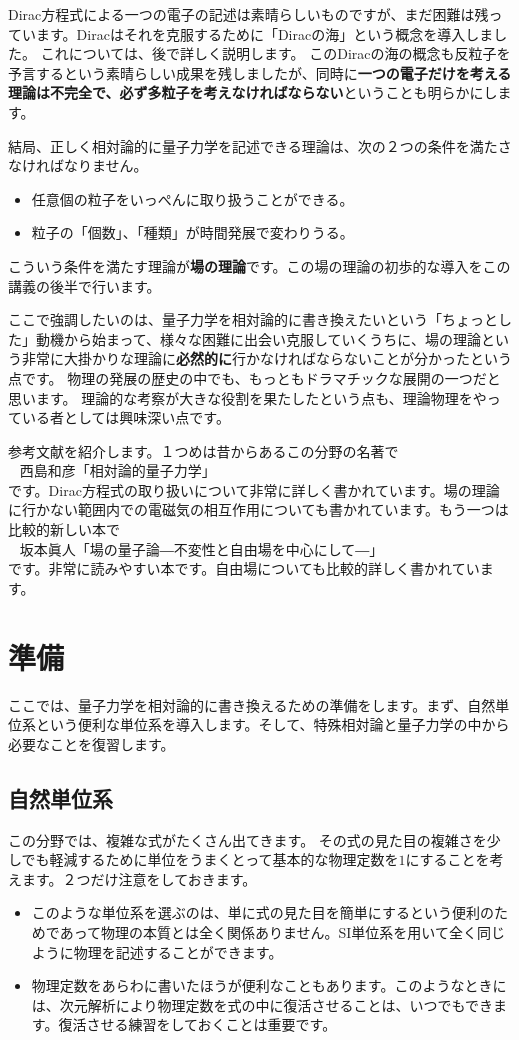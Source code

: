 \documentclass[report,paper=a4, fontsize=12pt, line_length=16cm, number_of_lines=33,dvipdfmx]{jlreq}
\newenvironment{mycite}{\\ \qquad \textbullet\ }{\\}
\numberwithin{equation}{chapter}
\newcommand{\strong}[1]{{\sffamily \bfseries #1}}
\begin{document}
Dirac方程式による一つの電子の記述は素晴らしいものですが、まだ困難は残っています。Diracはそれを克服するために「Diracの海」という概念を導入しました。
これについては、後で詳しく説明します。
このDiracの海の概念も反粒子を予言するという素晴らしい成果を残しましたが、同時に\strong{一つの電子だけを考える理論は不完全で、必ず多粒子を考えなければならない}ということも明らかにします。

結局、正しく相対論的に量子力学を記述できる理論は、次の２つの条件を満たさなければなりません。
\begin{itemize}
  \item 任意個の粒子をいっぺんに取り扱うことができる。
  \item 粒子の「個数」、「種類」が時間発展で変わりうる。
\end{itemize}
こういう条件を満たす理論が\strong{場の理論}です。この場の理論の初歩的な導入をこの講義の後半で行います。

ここで強調したいのは、量子力学を相対論的に書き換えたいという「ちょっとした」動機から始まって、様々な困難に出会い克服していくうちに、場の理論という非常に大掛かりな理論に\strong{必然的に}行かなければならないことが分かったという点です。
物理の発展の歴史の中でも、もっともドラマチックな展開の一つだと思います。
理論的な考察が大きな役割を果たしたという点も、理論物理をやっている者としては興味深い点です。

参考文献を紹介します。１つめは昔からあるこの分野の名著で
\begin{mycite}
  西島和彦「相対論的量子力学」
\end{mycite}
です。Dirac方程式の取り扱いについて非常に詳しく書かれています。場の理論に行かない範囲内での電磁気の相互作用についても書かれています。もう一つは比較的新しい本で
\begin{mycite}
  坂本眞人「場の量子論―不変性と自由場を中心にして―」
\end{mycite}
です。非常に読みやすい本です。自由場についても比較的詳しく書かれています。

\chapter{準備}
ここでは、量子力学を相対論的に書き換えるための準備をします。まず、自然単位系という便利な単位系を導入します。そして、特殊相対論と量子力学の中から必要なことを復習します。

\section{自然単位系}
この分野では、複雑な式がたくさん出てきます。
その式の見た目の複雑さを少しでも軽減するために単位をうまくとって基本的な物理定数を$1$にすることを考えます。２つだけ注意をしておきます。
\begin{itemize}
  \item このような単位系を選ぶのは、単に式の見た目を簡単にするという便利のためであって物理の本質とは全く関係ありません。SI単位系を用いて全く同じように物理を記述することができます。
  \item 物理定数をあらわに書いたほうが便利なこともあります。このようなときには、次元解析により物理定数を式の中に復活させることは、いつでもできます。復活させる練習をしておくことは重要です。
\end{itemize}
\end{document}
